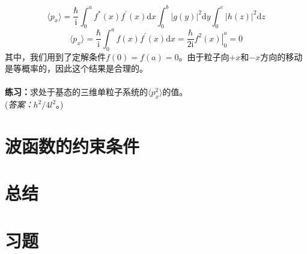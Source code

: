 \begin{examplebox}
\begin{equation*}
		\end{equation*}
		\begin{equation*}
			\langle p_x \rangle = \frac{\hbar}{\mathrm{i}}\int_{0}^{a}f^{\ast}\left(x\right)f^{\prime}\left(x\right)\mathrm{d}x \int_{0}^{b}\left|g\left(y\right)\right|^{2}\mathrm{d}y \int_{0}^{c}\left|h\left(z\right)\right|^{2}\mathrm{d}z
		\end{equation*}
		\begin{equation}
			\langle p_x \rangle = \frac{\hbar}{\mathrm{i}}\int_{0}^{a}f\left(x\right)f^{\prime}\left(x\right)\mathrm{d}x = \frac{\hbar}{2\mathrm{i}}\left. f^2\left(x\right) \right|_{0}^{a} = 0
			\label{eq:3.92}
		\end{equation}
		其中，我们用到了定解条件$f\left(0\right)=f\left(a\right)=0$。由于粒子向$+x$和$-x$方向的移动是等概率的，因此这个结果是合理的。\\
		\\
		\textbf{练习：}求处于基态的三维单粒子系统的$\langle p_x^2 \rangle$的值。\\
		(\textit{答案：}$h^2/4l^2$。)
	\end{examplebox}

\section{波函数的约束条件}

\section*{总结}

\section*{习题}